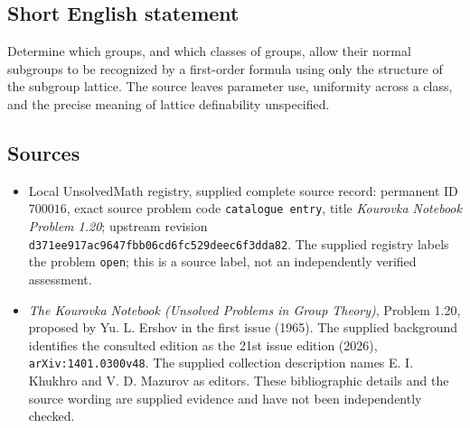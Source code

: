 \documentclass[11pt]{article}
\begin{document}
\subsection{Short English statement}
Determine which groups, and which classes of groups, allow their normal subgroups to be recognized by a first-order formula using only the structure of the subgroup lattice. The source leaves parameter use, uniformity across a class, and the precise meaning of lattice definability unspecified.
\subsection{Sources}
\begin{itemize}
\item Local UnsolvedMath registry, supplied complete source record: permanent ID \(700016\), exact source problem code \texttt{catalogue entry}, title \emph{Kourovka Notebook Problem 1.20}; upstream revision \texttt{d371ee917ac9647fbb06cd6fc529deec6f3dda82}. The supplied registry labels the problem \texttt{open}; this is a source label, not an independently verified assessment.
\item \emph{The Kourovka Notebook (Unsolved Problems in Group Theory)}, Problem 1.20, proposed by Yu. L. Ershov in the first issue (1965). The supplied background identifies the consulted edition as the 21st issue edition (2026), \texttt{arXiv:1401.0300v48}. The supplied collection description names E. I. Khukhro and V. D. Mazurov as editors. These bibliographic details and the source wording are supplied evidence and have not been independently checked.
\end{itemize}
\end{document}

